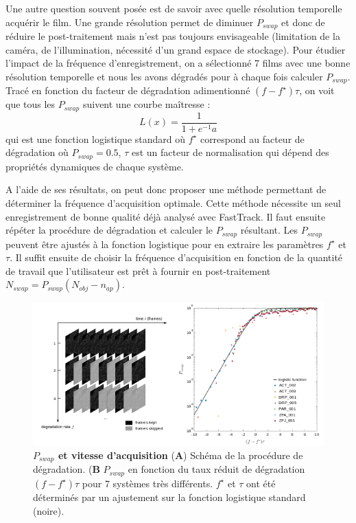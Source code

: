 	Une autre question souvent posée est de savoir avec quelle résolution temporelle acquérir le film. Une grande résolution permet de diminuer $P_{swap}$ et donc de réduire le post-traitement mais n'est pas toujours envisageable (limitation de la caméra, de l'illumination, nécessité d'un grand espace de stockage).
	Pour étudier l'impact de la fréquence d'enregistrement, on a sélectionné 7 films avec une bonne résolution temporelle et nous les avons dégradés pour à chaque fois calculer $P_{swap}$. Tracé en fonction du facteur de dégradation adimentionné $(f-f^{\star})\tau$, on voit que tous les $P_{swap}$ suivent une courbe maîtresse :
	$$
	    L(x)=\frac{1}{1+e^{-1}a}
	$$
	qui est une fonction logistique standard où $f^{\star}$ correspond au facteur de dégradation où $P_{swap}=0.5$, $\tau$ est un facteur de normalisation qui dépend des propriétés dynamiques de chaque système.

	
	A l'aide de ses résultats, on peut donc proposer une méthode permettant de déterminer la fréquence d'acquisition optimale. Cette méthode nécessite un seul enregistrement de bonne qualité déjà analysé avec FastTrack. Il faut ensuite répéter la procédure de dégradation et calculer le $P_{swap}$ résultant. Les $P_{swap}$ peuvent être ajustés à la fonction logistique pour en extraire les paramètres $f^{\star}$ et $\tau$. Il suffit ensuite de choisir la fréquence d'acquisition en fonction de la quantité de travail que l'utilisateur est prêt à fournir en post-traitement $N_{swap}=P_{swap}(N_{obj}-n_{ap})$.
	
	\begin{figure}[h]
    \centering
    \includegraphics[width=1\textwidth]{part_1/assets/Figure_5.png}    
    \caption{\textbf{$P_{swap}$ et vitesse d’acquisition} (\textbf{A}) Schéma de la procédure de dégradation. (\textbf{B} $P_{swap}$ en fonction du taux réduit de dégradation $(f-f^{\star})\tau$ pour 7 systèmes très différents. $f^{\star}$ et $\tau$ ont été déterminés par un ajustement sur la fonction logistique standard (noire).}
    \label{part_1:fig_5}
    \end{figure}
	
